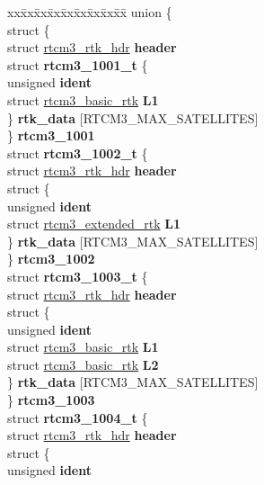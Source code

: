 \begin{DoxyCompactItemize}
\item 
\hypertarget{structrtcm3__t_ad086cb78d90a8d0459b8ea61c72dc993}{\begin{tabbing}
xx\=xx\=xx\=xx\=xx\=xx\=xx\=xx\=xx\=\kill
union \{\\
\>struct \{\\
\>\>struct \hyperlink{structrtcm3__rtk__hdr}{rtcm3\_rtk\_hdr} {\bfseries header}\\
\>\>struct {\bfseries rtcm3\_1001\_t} \{\\
\>\>\>unsigned {\bfseries ident}\\
\>\>\>struct \hyperlink{structrtcm3__basic__rtk}{rtcm3\_basic\_rtk} {\bfseries L1}\\
\>\>\} {\bfseries rtk\_data} \mbox{[}RTCM3\_MAX\_SATELLITES\mbox{]}\\
\>\} {\bfseries rtcm3\_1001}\\
\>struct {\bfseries rtcm3\_1002\_t} \{\\
\>\>struct \hyperlink{structrtcm3__rtk__hdr}{rtcm3\_rtk\_hdr} {\bfseries header}\\
\>\>struct \{\\
\>\>\>unsigned {\bfseries ident}\\
\>\>\>struct \hyperlink{structrtcm3__extended__rtk}{rtcm3\_extended\_rtk} {\bfseries L1}\\
\>\>\} {\bfseries rtk\_data} \mbox{[}RTCM3\_MAX\_SATELLITES\mbox{]}\\
\>\} {\bfseries rtcm3\_1002}\\
\>struct {\bfseries rtcm3\_1003\_t} \{\\
\>\>struct \hyperlink{structrtcm3__rtk__hdr}{rtcm3\_rtk\_hdr} {\bfseries header}\\
\>\>struct \{\\
\>\>\>unsigned {\bfseries ident}\\
\>\>\>struct \hyperlink{structrtcm3__basic__rtk}{rtcm3\_basic\_rtk} {\bfseries L1}\\
\>\>\>struct \hyperlink{structrtcm3__basic__rtk}{rtcm3\_basic\_rtk} {\bfseries L2}\\
\>\>\} {\bfseries rtk\_data} \mbox{[}RTCM3\_MAX\_SATELLITES\mbox{]}\\
\>\} {\bfseries rtcm3\_1003}\\
\>struct {\bfseries rtcm3\_1004\_t} \{\\
\>\>struct \hyperlink{structrtcm3__rtk__hdr}{rtcm3\_rtk\_hdr} {\bfseries header}\\
\>\>struct \{\\
\>\>\>unsigned {\bfseries ident}\\

\end{tabbing}}
\end{DoxyCompactItemize}
